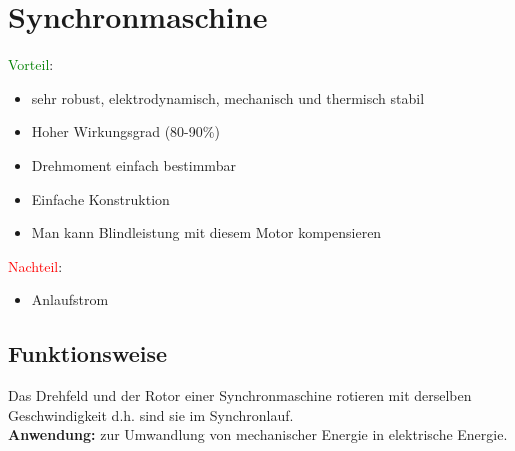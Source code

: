 \section{Synchronmaschine}
    \renewcommand{\arraystretch}{2.5}
{\scriptsize \textcolor{green}{Vorteil}:
\begin{itemize} 
	\item sehr robust, elektrodynamisch, mechanisch und thermisch stabil
    \item Hoher Wirkungsgrad (80-90\%)
	\item Drehmoment einfach bestimmbar
	\item Einfache Konstruktion
	\item Man kann Blindleistung mit diesem Motor kompensieren
\end{itemize}
\textcolor{red}{Nachteil}:
\begin{itemize}
\item Anlaufstrom
\end{itemize}}
\subsection{Funktionsweise}
Das Drehfeld und der Rotor einer Synchronmaschine rotieren mit derselben Geschwindigkeit d.h. sind sie im Synchronlauf. \\
\textbf{Anwendung:} zur Umwandlung von mechanischer Energie in elektrische Energie.
